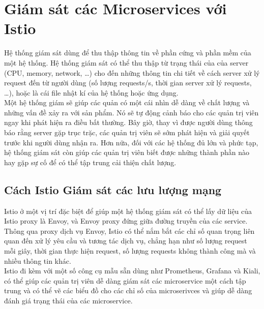 \documentclass[12pt,a4paper]{report}
\begin{document}
\section{Giám sát các Microservices với Istio}
	{\hspace{0.6cm}Hệ thống giám sát dùng để thu thập thông tin về phần cứng và phần mềm của một hệ thống. Hệ thống giám sát có thể thu thập từ trạng thái của của server (CPU, memory, network, …) cho đến những thông tin chi tiết về cách server xử lý request đến từ người dùng (số lượng requests/s, thời gian server xử lý requests, …), hoặc là cái file nhật kí của hệ thống hoặc ứng dụng.\\
	
	Một hệ thống giám sẽ giúp các quản có một cái nhìn dễ dàng về chất lượng và những vấn đề xảy ra với sản phẩm. Nó sẽ tự động cảnh báo cho các quản trị viên ngay khi phát hiện ra điều bất thường. Bây giờ, thay vì được người dùng thông báo rằng server gặp trục trặc, các quản trị viên sẽ sớm phát hiện và giải quyết trước khi người dùng nhận ra. Hơn nữa, đối với các hệ thống đủ lớn và phức tạp, hệ thống giám sát còn giúp các quản trị viên biết được những thành phần nào hay gặp sự cố để có thể tập trung cải thiện chất lượng.
		\subsection{Cách Istio Giám sát các lưu lượng mạng}
	{\hspace{0.6cm}Istio ở một vị trí đặc biệt để giúp một hệ thống giám sát có thể lấy dữ liệu của Istio proxy là Envoy, và Envoy proxy đứng giữa đường truyền của các service. Thông qua proxy dịch vụ Envoy, Istio có thể nắm bắt các chỉ số quan trọng liên quan đến xử lý yêu cầu và tương tác dịch vụ, chẳng hạn như số lượng request mỗi giây, thời gian thực hiện request, số lượng requests không thành công mà và nhiều thông tin khác.\\		
	
	Istio đi kèm với một số công cụ mẫu sẵn dùng như Prometheus, Grafana và Kiali, có thể giúp các quản trị viên dễ dàng giám sát các microservice một cách tập trung và có thể vẽ các biểu đồ cho các chỉ số của microserivces và giúp dễ dàng đánh giá trạng thái của các microservice.
	
}}
\end{document}
